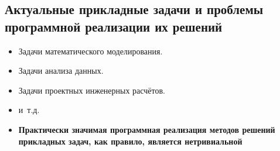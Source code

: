 ﻿\subsection{Актуальные прикладные задачи и проблемы программной реализации их решений}

\begin{frame}

  \begin{itemize}
    \item Задачи математического моделирования.
    \item Задачи анализа данных.
    \item Задачи проектных инженерных расчётов.
    \item и~т.д.
  \end{itemize}

  \vspace{0.05\textheight}

  \begin{itemize}
    \item \textbf{Практически значимая программная реализация методов решений прикладных задач, как правило, является нетривиальной}
  \end{itemize}
\end{frame}

